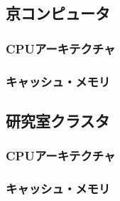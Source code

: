 \subsection{京コンピュータ}
\subsubsection{CPUアーキテクチャ}
\subsubsection{キャッシュ・メモリ}
\subsection{研究室クラスタ}
\subsubsection{CPUアーキテクチャ}
\subsubsection{キャッシュ・メモリ}
